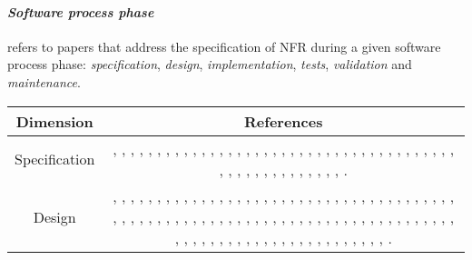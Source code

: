 \paragraph {\bf\em Software process phase} 
refers to papers that address the specification of NFR during a given software process phase: {\em specification},	 {\em design},	{\em implementation},	{\em tests},	{\em validation}	and {\em maintenance}.

\begin{table}\centering
\footnotesize
\begin{tabular}{|c|c|}\hline
\textbf{Dimension} & \textbf{References} \\ \hline
Specification	& 
\parbox{0.6\textwidth}{\cite{p005}, \cite{p006}, \cite{p009}, \cite{p012}, \cite{p013}, \cite{p016},  \cite{p017}, \cite{p018}, \cite{p019}, \cite{p020}, \cite{p021}, \cite{p023}, \cite{p024}, \cite{p026},  \cite{p034}, \cite{p036}, \cite{p037}, \cite{p041}, \cite{p043}, \cite{p044}, \cite{p045}, \cite{p046},  \cite{p047}, \cite{p048}, \cite{p055}, \cite{p069}, \cite{p076}, \cite{p077}, \cite{p078}, \cite{p090},  \cite{p091}, \cite{p092}, \cite{p098}, \cite{p099}, \cite{p100}, \cite{p105}, \cite{p109}, \cite{p112},  \cite{p116}, \cite{p118}, \cite{p119}, \cite{p123}, \cite{p124}, \cite{p129}, \cite{p130}, \cite{p131},  \cite{p132}, \cite{p133}, \cite{p134}, \cite{p135}, \cite{p136}, \cite{p146}, \cite{p149}, \cite{p151}.}
\\ \hline
Design		&
\parbox{0.6\textwidth}{\cite{p001}, \cite{p002}, \cite{p003}, \cite{p004}, \cite{p005}, \cite{p007},  \cite{p008}, \cite{p009}, \cite{p010}, \cite{p011}, \cite{p012}, \cite{p014}, \cite{p015}, \cite{p016},  \cite{p017}, \cite{p018}, \cite{p020}, \cite{p023}, \cite{p024}, \cite{p025}, \cite{p026}, \cite{p027},  \cite{p029}, \cite{p031}, \cite{p032}, \cite{p034}, \cite{p036}, \cite{p037}, \cite{p044}, \cite{p046},  \cite{p049}, \cite{p052}, \cite{p053}, \cite{p054}, \cite{p056}, \cite{p057}, \cite{p059}, \cite{p064}, \cite{p065}, \cite{p066}, \cite{p067}, \cite{p069}, \cite{p070}, \cite{p073}, \cite{p074}, \cite{p078}, \cite{p079}, \cite{p080}, \cite{p083}, \cite{p084}, \cite{p085}, \cite{p086}, \cite{p089}, \cite{p091},  \cite{p093}, \cite{p094}, \cite{p095}, \cite{p096}, \cite{p097}, \cite{p098}, \cite{p099}, \cite{p100}, \cite{p101}, \cite{p102}, \cite{p103}, \cite{p104}, \cite{p105}, \cite{p109}, \cite{p110}, \cite{p118}, \cite{p119}, \cite{p120}, \cite{p121}, \cite{p122}, \cite{p124}, \cite{p125}, \cite{p126}, \cite{p127}, \cite{p128}, \cite{p129}, \cite{p130}, \cite{p136}, \cite{p138}, \cite{p139}, \cite{p145}, \cite{p147}, \cite{p148}, \cite{p149}, \cite{p150}, \cite{p151}, \cite{p152}, \cite{p153}, \cite{p154}, \cite{p155}, \cite{p156}, \cite{p157}, \cite{p162}, \cite{p163}, \cite{p165}, \cite{p166}, \cite{p168}, \cite{p169}, \cite{p170}.}

\end{tabular}
\end{table}
